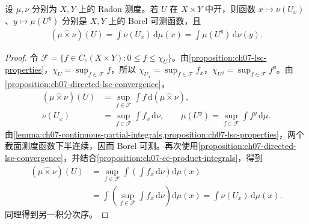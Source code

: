 \documentclass[../../main.tex]{subfiles}
\begin{document}
\begin{proposition}\label{proposition:ch07-open-set-product-integrals}
设 $\mu,\nu$ 分别为 $X,Y$ 上的 Radon 测度。若 $U$ 在 $X\times Y$ 中开，则函数 $x\mapsto\nu(U_x)$、$y\mapsto\mu(U^y)$ 分别是 $X,Y$ 上的 Borel 可测函数，且
\begin{align*}
(\mu\mathbin{\widehat\times}\nu)(U)
=\int\nu(U_x)\,\mathrm d\mu(x)=\int\mu(U^y)\,\mathrm d\nu(y).
\end{align*}
\end{proposition}
\begin{proof}
令 $\mathcal F=\{f\in C_c(X\times Y):0\leqslant f\leqslant\chi_U\}$。由\cref{proposition:ch07-lsc-properties}，$\chi_U=\sup_{f\in\mathcal F}f$，所以 $\chi_{U_x}=\sup_{f\in\mathcal F}f_x$，$\chi_{U^y}=\sup_{f\in\mathcal F}f^y$。由\cref{proposition:ch07-directed-lsc-convergence}，
\begin{align*}
(\mu\mathbin{\widehat\times}\nu)(U)
&=\sup_{f\in\mathcal F}\int f\,\mathrm d(\mu\mathbin{\widehat\times}\nu),\\
\nu(U_x)&=\sup_{f\in\mathcal F}\int f_x\,\mathrm d\nu,\qquad
\mu(U^y)=\sup_{f\in\mathcal F}\int f^y\,\mathrm d\mu.
\end{align*}
由\cref{lemma:ch07-continuous-partial-integrals,proposition:ch07-lsc-properties}，两个截面测度函数下半连续，因而 Borel 可测。再次使用\cref{proposition:ch07-directed-lsc-convergence}，并结合\cref{proposition:ch07-cc-product-integrals}，得到
\begin{align*}
(\mu\mathbin{\widehat\times}\nu)(U)
&=\sup_{f\in\mathcal F}\int\left(\int f_x\,\mathrm d\nu\right)\mathrm d\mu(x)\\
&=\int\left(\sup_{f\in\mathcal F}\int f_x\,\mathrm d\nu\right)\mathrm d\mu(x)
=\int\nu(U_x)\,\mathrm d\mu(x).
\end{align*}
同理得到另一积分次序。
\end{proof}
\end{document}
